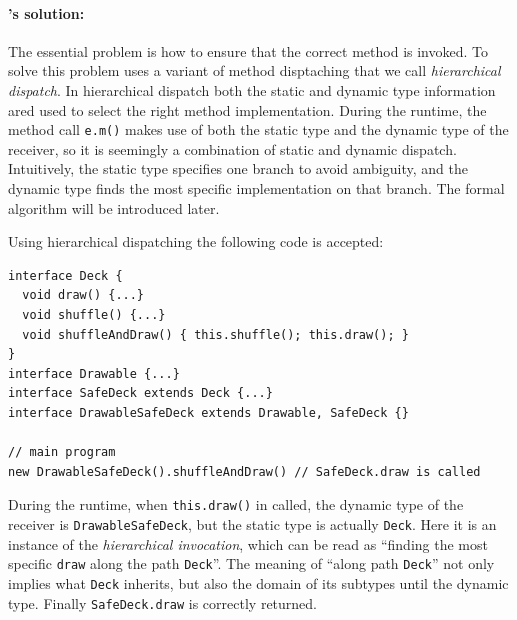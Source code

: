 
\paragraph{\MIM's solution:} 
The essential problem is how to ensure that the correct method is
invoked. To solve this problem \MIM{} uses a variant of method
disptaching that we call \textit{hierarchical dispatch}. In
hierarchical dispatch both the static and dynamic type information 
ared used to select the right method implementation.
During the runtime, the method call \lstinline|e.m()|
makes use of both the static type and the dynamic type of the receiver, so it is seemingly a
combination of static and dynamic dispatch. Intuitively, the static type specifies one branch
to avoid ambiguity, and the dynamic type finds the most specific implementation on that branch. The formal algorithm
will be introduced later.

Using hierarchical dispatching the following code is accepted:
\vspace{3pt}\begin{lstlisting}
interface Deck {
  void draw() {...}
  void shuffle() {...}
  void shuffleAndDraw() { this.shuffle(); this.draw(); }
}
interface Drawable {...}
interface SafeDeck extends Deck {...}
interface DrawableSafeDeck extends Drawable, SafeDeck {}

// main program
new DrawableSafeDeck().shuffleAndDraw() // SafeDeck.draw is called
\end{lstlisting}\vspace{3pt}
During the runtime, when \lstinline|this.draw()| in called,
the dynamic type of the receiver is \lstinline|DrawableSafeDeck|, but the static type is actually
\lstinline|Deck|. Here it is an instance of the \textit{hierarchical invocation}, which can be read as 
``finding the most specific \lstinline|draw| along the path \lstinline|Deck|''. The meaning of ``along path
\lstinline|Deck|'' not only implies what \lstinline|Deck| inherits, but also the domain of its subtypes until the
dynamic type. Finally \lstinline|SafeDeck.draw| is correctly returned.

